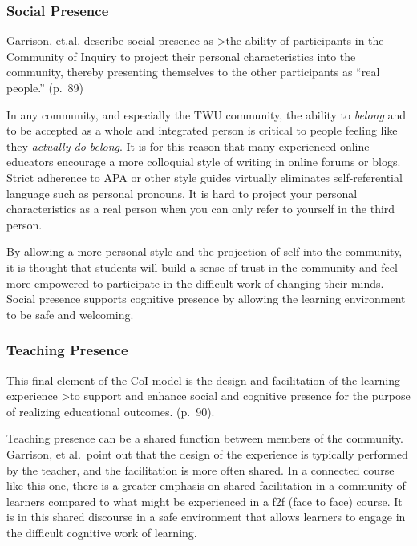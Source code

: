 \documentclass[
]{book}
\begin{document}
\hypertarget{social-presence}{%
\subsubsection*{Social Presence}\label{social-presence}}

Garrison, et.al. describe social presence as
\textgreater the ability of participants in the Community of Inquiry to project their personal characteristics into the community, thereby presenting themselves to the other participants as ``real people.'' (p.~89)

In any community, and especially the TWU community, the ability to \emph{belong} and to be accepted as a whole and integrated person is critical to people feeling like they \emph{actually do belong}. It is for this reason that many experienced online educators encourage a more colloquial style of writing in online forums or blogs. Strict adherence to APA or other style guides virtually eliminates self-referential language such as personal pronouns. It is hard to project your personal characteristics as a real person when you can only refer to yourself in the third person.

By allowing a more personal style and the projection of self into the community, it is thought that students will build a sense of trust in the community and feel more empowered to participate in the difficult work of changing their minds. Social presence supports cognitive presence by allowing the learning environment to be safe and welcoming.

\hypertarget{teaching-presence}{%
\subsubsection*{Teaching Presence}\label{teaching-presence}}

This final element of the CoI model is the design and facilitation of the learning experience
\textgreater to support and enhance social and cognitive presence for the purpose of realizing educational outcomes. (p.~90).

Teaching presence can be a shared function between members of the community. Garrison, et al.~point out that the design of the experience is typically performed by the teacher, and the facilitation is more often shared. In a connected course like this one, there is a greater emphasis on shared facilitation in a community of learners compared to what might be experienced in a f2f (face to face) course. It is in this shared discourse in a safe environment that allows learners to engage in the difficult cognitive work of learning.
\end{document}
